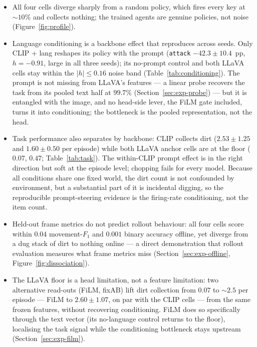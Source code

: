 \begin{itemize}
\item All four cells diverge sharply from a random policy, which fires every key
at $\sim\!10\%$ and collects nothing; the trained agents are genuine policies,
not noise (Figure~\ref{fig:profile}).
\item Language conditioning is a backbone effect that reproduces across seeds.
Only CLIP + lang reshapes its policy with the prompt (\texttt{attack}
$-42.3\pm10.4$~pp, $h=-0.91$, large in all three seeds); its no-prompt control
and both LLaVA cells stay within the $|h|\le0.16$ noise band
(Table~\ref{tab:conditioning}). The prompt is not missing from LLaVA's features
--- a linear probe recovers the task from its pooled text half at $99.7\%$
(Section~\ref{sec:exp-probe}) --- but it is entangled with the image, and no
head-side lever, the FiLM gate included, turns it into conditioning; the
bottleneck is the pooled representation, not the head.
\item Task performance also separates by backbone: CLIP collects dirt
($2.53\pm1.25$ and $1.60\pm0.50$ per episode) while both LLaVA anchor cells are at
the floor ($0.07$, $0.47$; Table~\ref{tab:task}). The within-CLIP prompt effect
is in the right direction but soft at the episode level; chopping fails for every
model. Because all conditions share one fixed world, the dirt count is not
confounded by environment, but a substantial part of it is incidental digging, so
the reproducible prompt-steering evidence is the firing-rate conditioning, not the
item count.
\item Held-out frame metrics do not predict rollout behaviour: all four cells
score within $0.04$ movement-$F_1$ and $0.001$ binary accuracy offline, yet
diverge from a dug stack of dirt to nothing online --- a direct demonstration
that rollout evaluation measures what frame metrics miss
(Section~\ref{sec:exp-offline}, Figure~\ref{fig:dissociation}).
\item The LLaVA floor is a head limitation, not a feature limitation: two
alternative read-outs (FiLM, fixAB) lift dirt collection from $0.07$ to ${\sim}2.5$
per episode --- FiLM to $2.60\pm1.07$, on par with the CLIP cells --- from the
same frozen features, without recovering conditioning. FiLM does so specifically
through the text vector (its no-language control returns to the floor), localising
the task signal while the conditioning bottleneck stays upstream
(Section~\ref{sec:exp-film}).
\end{itemize}
